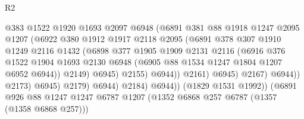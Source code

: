 \begin{lexlean}{R2}
\begin{coremodule}
                                    @383
                                    @1522
                                    @1920
                                    @1693
                                    @2097
                                    @6948
                                    (@6891
                                      @381
                                      @88
                                      @1918
                                      @1247
                                      @2095
                                      @1207
                                      (@6922
                                        @380
                                        @1912
                                        @1917
                                        @2118
                                        @2095
                                        (@6891
                                          @378
                                          @307
                                          @1910
                                          @1249
                                          @2116
                                          @1432
                                          (@6898
                                            @377
                                            @1905
                                            @1909
                                            @2131
                                            @2116
                                            (@6916
                                              @376
                                              @1522
                                              @1904
                                              @1693
                                              @2130
                                              @6948
                                              (@6905 @88 @1534 @1247 @1804 @1207 @6952 @6944))
                                            @2149)
                                          @6945)
                                        @2155)
                                      @6944))
                                  @2161)
                                @6945)
                              @2167)
                            @6944))
                        @2173)
                      @6945)
                    @2179)
                  @6944)
                @2184)
              @6944))
          (@1829 @1531 @1992))
        (@6891
          @926
          @88
          @1247
          @1247
          @6787
          @1207
          (@1352 @6868 @257 @6787 (@1357 (@1358 @6868 @257)))

\end{coremodule}
\end{lexlean}

